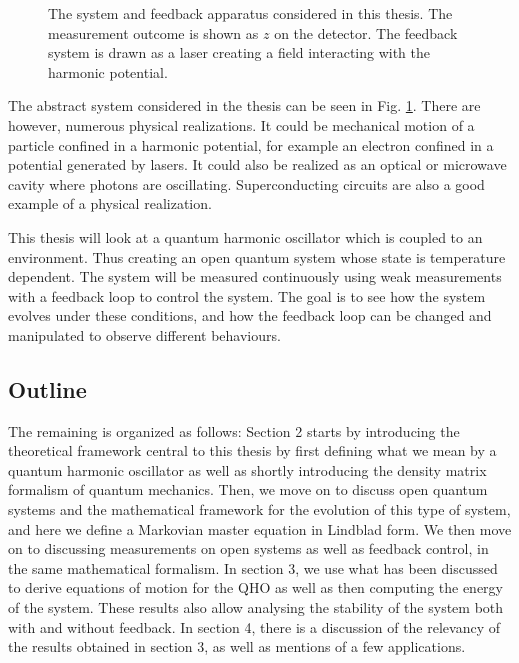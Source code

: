 \begin{figure}
    \centering
    
    \caption{\small The system and feedback apparatus considered in this thesis. The measurement outcome is shown as $z$ on the detector. The feedback system is drawn as a laser creating a field interacting with the harmonic potential.}
    \label{fig:system}
\end{figure}

The abstract system considered in the thesis can be seen in Fig. \ref{fig:system}. There are however, numerous physical realizations. It could be mechanical motion of a particle confined in a harmonic potential, for example an electron confined in a potential generated by lasers. It could also be realized as an optical or microwave cavity where photons are oscillating. Superconducting circuits are also a good example of a physical realization.

This thesis will look at a quantum harmonic oscillator which is coupled to an environment. Thus creating an open quantum system whose state is temperature dependent. The system will be measured continuously using weak measurements with a feedback loop to control the system. The goal is to see how the system evolves under these conditions, and how the feedback loop can be changed and manipulated to observe different behaviours.

\subsection{Outline}
The remaining is organized as follows: Section 2 starts by introducing the theoretical framework central to this thesis by first defining what we mean by a quantum harmonic oscillator as well as shortly introducing the density matrix formalism of quantum mechanics. Then, we move on to discuss open quantum systems and the mathematical framework for the evolution of this type of system, and here we define a Markovian master equation in Lindblad form. We then move on to discussing measurements on open systems as well as feedback control, in the same mathematical formalism. In section 3, we use what has been discussed to derive equations of motion for the QHO as well as then computing the energy of the system. These results also allow analysing the stability of the system both with and without feedback. In section 4, there is a discussion of the relevancy of the results obtained in section 3, as well as mentions of a few applications.


